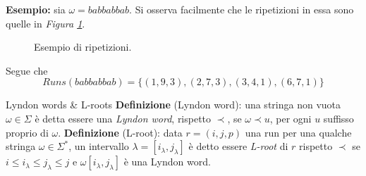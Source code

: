 \documentclass{beamer}
\begin{document}
    \begin{frame}
        \textbf{Esempio: } sia \(\omega = babbabbab\).
        Si osserva facilmente che le ripetizioni in essa sono quelle 
        in \emph{Figura \ref{fig:1}}.
        \begin{figure}[!h]
            \centering
            \caption{Esempio di ripetizioni.}
            \label{fig:1}
        \end{figure}
        Segue che 
            \[
                Runs(babbabbab) = \{(1, 9, 3), (2, 7, 3), (3, 4, 1), (6, 7, 1)\} 
            \]
    \end{frame}

    \begin{frame}{Lyndon words \&  L-roots}
        \textbf{Definizione} (Lyndon word): una stringa non vuota \(\omega \in \Sigma\)
        è detta essere una \emph{Lyndon word}, rispetto \(\prec\), 
        se \(\omega \prec u\), per ogni \(u\) suffisso proprio di \(\omega\).
        \vskip 15pt 
        \textbf{Definizione} (L-root): data \(r = (i, j, p)\) una run per una 
        qualche stringa \(\omega \in \Sigma^{*}\),
        un intervallo \(\lambda = [i_{\lambda}, j_{\lambda}]\) è detto essere
        \emph{L-root} di \(r\) rispetto \(\prec\) se 
        \(i \le i_{\lambda} \le j_{\lambda} \le j\)
        e \(\omega[i_{\lambda}, j_{\lambda}]\) è una Lyndon word.
    \end{frame}
\end{document}
